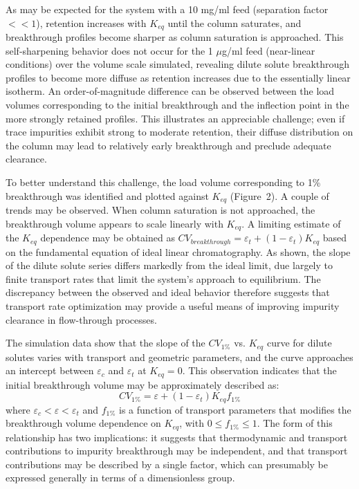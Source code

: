 \documentclass[preprint,review,12pt]{elsarticle}
\begin{document}
        As may be expected for the system with a 10 mg/ml feed (separation factor $<< 1$), retention increases with $K_{eq}$ until the column saturates, and breakthrough profiles become sharper as column saturation is approached. This self-sharpening behavior does not occur for the 1 $\mu$g/ml feed (near-linear conditions) over the volume scale simulated, revealing dilute solute breakthrough profiles to become more diffuse as retention increases due to the essentially linear isotherm. An order-of-magnitude difference can be observed between the load volumes corresponding to the initial breakthrough and the inflection point in the more strongly retained profiles. This illustrates an appreciable challenge; even if trace impurities exhibit strong to moderate retention, their diffuse distribution on the column may lead to relatively early breakthrough and preclude adequate clearance.


        To better understand this challenge, the load volume corresponding to 1\% breakthrough was identified and plotted against $K_{eq}$ (Figure~2). A couple of trends may be observed. When column saturation is not approached, the breakthrough volume appears to scale linearly with $K_{eq}$. A limiting estimate of the $K_{eq}$ dependence may be obtained as $CV_{breakthrough} = \varepsilon_t + (1 - \varepsilon_t) K_{eq}$ based on the fundamental equation of ideal linear chromatography. As shown, the slope of the dilute solute series differs markedly from the ideal limit, due largely to finite transport rates that limit the system's approach to equilibrium. The discrepancy between the observed and ideal behavior therefore suggests that transport rate optimization may provide a useful means of improving impurity clearance in flow-through processes.

        The simulation data show that the slope of the $CV_{1\%}$ vs. $K_{eq}$ curve for dilute solutes varies with transport and geometric parameters, and the curve approaches an intercept between $\varepsilon_c$ and $\varepsilon_t$ at $K_{eq} = 0$. This observation indicates that the initial breakthrough volume may be approximately described as:
        \begin{equation} \label{eq:hypothesis}
            CV_{1\%} = \varepsilon + (1 - \varepsilon_t) K_{eq} f_{1\%}
        \end{equation}
        where $\varepsilon_c < \varepsilon < \varepsilon_t$ and $f_{1\%}$ is a function of transport parameters that modifies the breakthrough volume dependence on $K_{eq}$, with $0 \leq f_{1\%} \leq 1$. The form of this relationship has two implications:  it suggests that thermodynamic and transport contributions to impurity breakthrough may be independent, and that transport contributions may be described by a single factor, which can presumably be expressed generally in terms of a dimensionless group.
\end{document}
